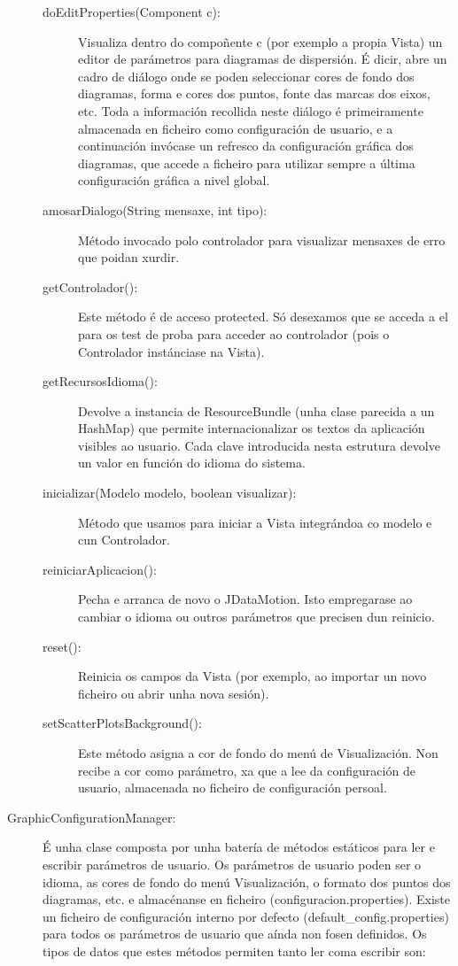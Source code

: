 \begin{description}
\begin{description}
\item[doEditProperties(Component c):] \hfill
Visualiza dentro do compoñente c (por exemplo a propia Vista) un editor de parámetros para diagramas de dispersión. É dicir, abre un cadro de diálogo onde se poden seleccionar cores de fondo dos diagramas, forma e cores dos puntos, fonte das marcas dos eixos, etc. Toda a información recollida neste diálogo é primeiramente almacenada en ficheiro como configuración de usuario, e a continuación invócase un refresco da configuración gráfica dos diagramas, que accede a ficheiro para utilizar sempre a última configuración gráfica a nivel global.
\item[amosarDialogo(String mensaxe, int tipo):] \hfill
Método invocado polo controlador para visualizar mensaxes de erro que poidan xurdir.
\item[getControlador():] \hfill
Este método é de acceso protected. Só desexamos que se acceda a el para os test de proba para acceder ao controlador (pois o Controlador instánciase na Vista).
\item[getRecursosIdioma():] \hfill
Devolve a instancia de ResourceBundle (unha clase parecida a un HashMap) que permite internacionalizar os textos da aplicación visibles ao usuario. Cada clave introducida nesta estrutura devolve un valor en función do idioma do sistema.
\item[inicializar(Modelo modelo, boolean visualizar):] \hfill
Método que usamos para iniciar a Vista integrándoa co modelo e cun Controlador.
\item[reiniciarAplicacion():] \hfill
Pecha e arranca de novo o JDataMotion. Isto empregarase ao cambiar o idioma ou outros parámetros que precisen dun reinicio.
\item[reset():] \hfill
Reinicia os campos da Vista (por exemplo, ao importar un novo ficheiro ou abrir unha nova sesión).
\item[setScatterPlotsBackground():] \hfill
Este método asigna a cor de fondo do menú de Visualización. Non recibe a cor como parámetro, xa que a lee da configuración de usuario, almacenada no ficheiro de configuración persoal.
\end{description}

\item[GraphicConfigurationManager:] \hfill
É unha clase composta por unha batería de métodos estáticos para ler e escribir parámetros de usuario. Os parámetros de usuario poden ser o idioma, as cores de fondo do menú Visualización, o formato dos puntos dos diagramas, etc. e almacénanse en ficheiro (configuracion.properties). Existe un ficheiro de configuración interno por defecto (default\_config.properties) para todos os parámetros de usuario que aínda non fosen definidos. Os tipos de datos que estes métodos permiten tanto ler coma escribir son:


\end{description}
